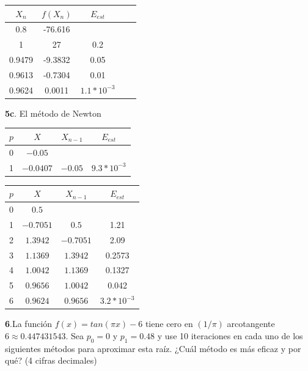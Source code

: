 \documentclass[12pt]{article}
\begin{document}
\begin{center}
    \begin{tabular}{|c|c|c|c|c|}
        \hline
        $X_n$&$f(X_n)$&$E_{est}$\\
        \hline
        0.8        &-76.616 &  \\
        1          &27      &0.2\\
        0.9479  &-9.3832&0.05\\
        0.9613  &-0.7304&0.01\\
        0.9624  &0.0011&$1.1*10^{-3}$\\
        \hline
      \end{tabular} 
\end{center}

\textbf{5c}. El método de Newton

\begin{center}
    \begin{tabular}{|c|c|c|c|}
        \hline
        $p$&$X$&$X_{n-1}$&$E_{est}$\\
        \hline
        0 & $-0.05$&  & \\
        1 &$-0.0407$&$-0.05$&$9.3*10^{-3}$\\
        \hline
      \end{tabular} 
\end{center}

\begin{center}
    \begin{tabular}{|c|c|c|c|}
        \hline
        $p$&$X$&$X_{n-1}$&$E_{est}$\\
        \hline
        0 & $0.5$&  & \\
        1 &$-0.7051$&$0.5$&1.21\\
        2 &$1.3942$&$-0.7051$&2.09\\
        3 &$1.1369$&$1.3942$&0.2573\\
        4 &$1.0042$&$1.1369$&0.1327\\
        5 &$0.9656$&$1.0042$&0.042\\
        6 &$0.9624$&$0.9656$&$3.2*10^{-3}$\\
        \hline
      \end{tabular} 
\end{center}



\textbf{6}.La función $f(x) = tan(\pi x) - 6$ tiene cero en $(1/\pi)$ arcotangente $6 \approx  0.447431543$. Sea $p_0 = 0$ y $p_1 = 0.48$
y use 10 iteraciones en cada uno de los siguientes métodos para aproximar esta raíz. ¿Cuál método es más eficaz y por qué?
(4 cifras decimales)
\end{document}
